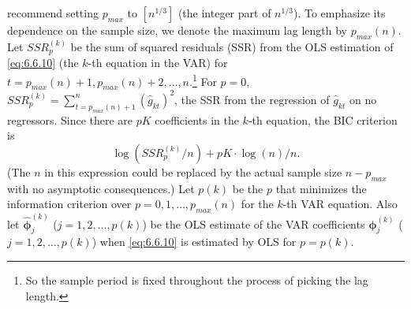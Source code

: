 recommend setting $p_{max}$ to $[n^{1/3}]$ (the integer part of $n^{1/3}$). To emphasize
its dependence on the sample size, we denote the maximum lag length by
$p_{max}(n)$. Let $SSR_p^{(k)}$ be the sum of squared residuals (SSR) from the OLS
estimation of \eqref{eq:6.6.10} (the $k$-th equation in the VAR) for $t = p_{max}(n) +
1, p_{max}(n) + 2, \ldots, n$.\footnote{So the sample period is fixed throughout the process of picking the lag length.}
For $p = 0$, $SSR_p^{(k)} = \sum_{t=p_{max}(n)+1}^{n} (\hat{g}_{kt})^2$, the SSR
from the regression of $\hat{g}_{kt}$ on no regressors. Since there are $pK$ coefficients
in the $k$-th equation, the BIC criterion is
\begin{equation}
  \log(SSR_p^{(k)} / n) + pK \cdot \log(n) / n.
  \label{eq:6.6.11}
\end{equation}
(The $n$ in this expression could be replaced by the actual sample size $n -
p_{max}$ with no asymptotic consequences.) Let $p(k)$ be the $p$ that minimizes
the information criterion over $p = 0, 1, \ldots, p_{max}(n)$ for the $k$-th VAR
equation. Also let $\hat{\bm{\phi}}_j^{(k)}$ ($j = 1, 2, \ldots, p(k)$) be the OLS estimate of the
VAR coefficients $\bm{\phi}_j^{(k)}$ ($j = 1, 2, \ldots, p(k)$) when \eqref{eq:6.6.10} is estimated by
OLS for $p = p(k)$.


